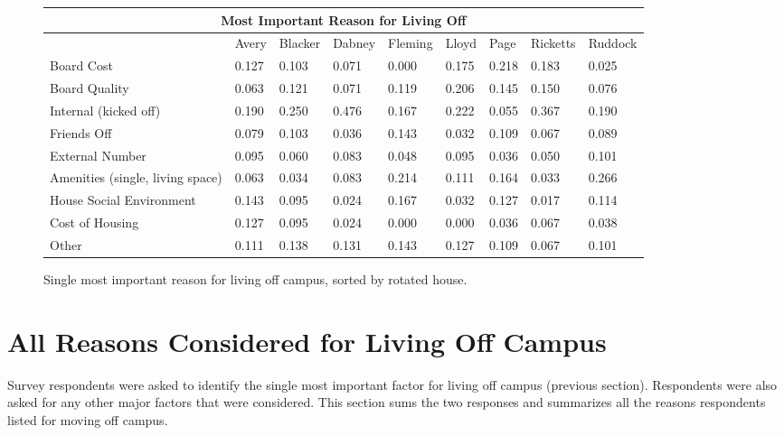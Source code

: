 \documentclass[12pt]{article} %
\begin{document}
\begin{figure}[H]
	
\begin{center}
\begin{tabular}{|m{4 cm}|m{1.3 cm}|m{1.3 cm}|m{1.3 cm}|m{1.3 cm}|m{1.3 cm}|m{1.3 cm}|m{1.3 cm}|m{1.3 cm} |}
\hline
\multicolumn{9}{|c|}{Most Important Reason for Living Off}\\ \hline
& Avery&Blacker&Dabney&Fleming&Lloyd&Page&Ricketts&Ruddock\\ \hline
Board Cost   &  0.127 &  0.103 &  0.071 &  0.000 &  0.175 &  0.218 &  0.183 &  0.025\\ \hline
Board Quality   &  0.063 &  0.121 &  0.071 &  0.119 &  0.206 &  0.145 &  0.150 &  0.076\\ \hline
Internal (kicked off)   &  0.190 &  0.250 &  0.476 &  0.167 &  0.222 &  0.055 &  0.367 &  0.190\\ \hline
Friends Off   &  0.079 &  0.103 &  0.036 &  0.143 &  0.032 &  0.109 &  0.067 &  0.089\\ \hline
External Number   &  0.095 &  0.060 &  0.083 &  0.048 &  0.095 &  0.036 &  0.050 &  0.101\\ \hline
Amenities \newline(single, living space)   &  0.063 &  0.034 &  0.083 &  0.214 &  0.111 &  0.164 &  0.033 &  0.266\\ \hline
House Social Environment   &  0.143 &  0.095 &  0.024 &  0.167 &  0.032 &  0.127 &  0.017 &  0.114\\ \hline
Cost of Housing   &  0.127 &  0.095 &  0.024 &  0.000 &  0.000 &  0.036 &  0.067 &  0.038\\ \hline
Other   &  0.111 &  0.138 &  0.131 &  0.143 &  0.127 &  0.109 &  0.067 &  0.101\\ \hline
\end{tabular}
\end{center}
	\caption{Single most important reason for living off campus, sorted by rotated house.}
\end{figure}



\newpage
\section{All Reasons Considered for Living Off Campus}
Survey respondents were asked to identify the single most important factor for living off campus (previous section). Respondents were also asked for any other major factors that were considered. This section sums the two responses and summarizes all the reasons respondents listed for moving off campus.
\end{document}
